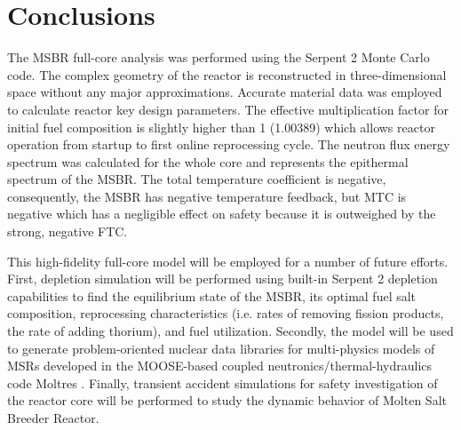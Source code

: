 \documentclass{anstrans}
\begin{document}
\section{Conclusions}
The MSBR full-core analysis was performed using the Serpent 2 Monte Carlo code. The complex geometry of the reactor is reconstructed in three-dimensional space without any major approximations. Accurate material data was employed to calculate reactor key design parameters. The effective multiplication factor for initial fuel composition is slightly higher than 1 (1.00389) which allows reactor operation from startup to first online reprocessing cycle. The neutron flux energy spectrum was calculated for the whole core and represents the epithermal spectrum of the MSBR. The total temperature coefficient is negative, consequently, the MSBR has negative temperature feedback, but MTC is negative which has a negligible effect on safety because it is outweighed by the strong, negative FTC.

This high-fidelity full-core model will be employed for a number of future efforts. First, depletion simulation will be performed using built-in Serpent 2 depletion capabilities to find the equilibrium state of the MSBR, its optimal fuel salt composition, reprocessing characteristics (i.e. rates of removing fission products, the rate of adding thorium), and fuel utilization. Secondly, the model will be used to generate problem-oriented nuclear data libraries for multi-physics models of \glspl{MSR} developed in the MOOSE-based coupled neutronics/thermal-hydraulics code Moltres \cite{lindsay_arfc/moltres:_2017}. Finally, transient accident simulations for safety investigation of the reactor core will be performed to study the dynamic behavior of Molten Salt Breeder Reactor. 




\end{document}
